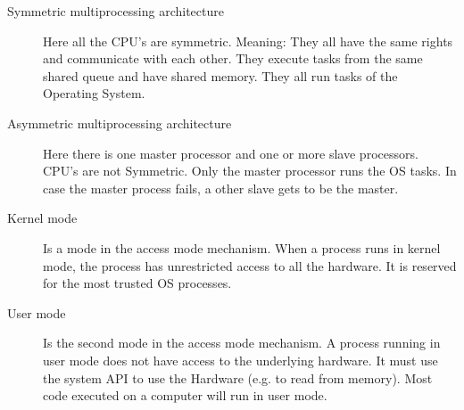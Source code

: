 \documentclass{article}
\begin{document}
\begin{description}
			\item[Symmetric multiprocessing architecture] Here all the CPU's are symmetric. Meaning: They all have the same rights and communicate with each other. They execute tasks from the same shared queue and have shared memory. They all run tasks of the Operating System. 
			
			\item[Asymmetric multiprocessing architecture] Here there is one master processor and one or more slave processors. CPU's are not Symmetric. Only the master processor runs the OS tasks. In case the master process fails, a other slave gets to be the master. 
			
			\item[Kernel mode] Is a mode in the access mode mechanism. When a process runs in kernel mode, the process has unrestricted access to all the hardware. It is reserved for the most trusted OS processes. 
			
			\item[User mode] Is the second mode in the access mode mechanism. A process running in user mode does not have access to the underlying hardware. It must use the system API to use the Hardware (e.g. to read from memory). Most code executed on a computer will run in user mode. 
		 \end{description}
		 
\end{document}
